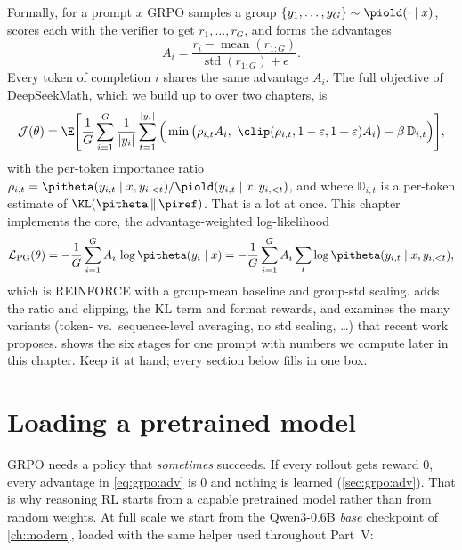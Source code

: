 Formally, for a prompt $x$ GRPO samples a group $\{y_1,\dots,y_G\}\sim\piold(\cdot\mid x)$,
scores each with the verifier to get $r_1,\dots,r_G$, and forms the advantages
\begin{equation}
A_i=\frac{r_i-\operatorname{mean}(r_{1:G})}{\operatorname{std}(r_{1:G})+\epsilon}.
\label{eq:grpo:adv}
\end{equation}
Every token of completion $i$ shares the same advantage $A_i$. The full objective of
DeepSeekMath, which we build up to over two chapters, is
\begin{equation}
\mathcal{J}(\theta)=\E\Bigg[\frac1G\sum_{i=1}^{G}\frac1{|y_i|}\sum_{t=1}^{|y_i|}
\Big(\min\big(\rho_{i,t}A_i,\ \clip(\rho_{i,t},1-\varepsilon,1+\varepsilon)A_i\big)
-\beta\,\mathbb{D}_{i,t}\Big)\Bigg],
\label{eq:grpo:full}
\end{equation}
with the per-token importance ratio
$\rho_{i,t}=\pitheta(y_{i,t}\mid x,y_{i,<t})/\piold(y_{i,t}\mid x,y_{i,<t})$, and where $\mathbb{D}_{i,t}$ is a per-token estimate of $\KL(\pitheta\,\|\,\piref)$. That is a
lot at once. This chapter implements the core, the advantage-weighted log-likelihood
\begin{equation}
\mathcal{L}_{\text{PG}}(\theta)=-\frac1G\sum_{i=1}^G A_i\,\log\pitheta(y_i\mid x)
 =-\frac1G\sum_{i=1}^G A_i\sum_{t}\log\pitheta(y_{i,t}\mid x,y_{i,<t}),
\label{eq:grpo:pg_loss}
\end{equation}
which is REINFORCE with a group-mean baseline and group-std scaling.  adds
the ratio and clipping, the KL term and format rewards, and examines the many variants
(token- vs.\ sequence-level averaging, no std scaling, \dots) that recent work proposes.
 shows the six stages for one prompt with numbers we compute later in
this chapter. Keep it at hand; every section below fills in one box.


\section{Loading a pretrained model}\label{sec:grpo:load}

GRPO needs a policy that \emph{sometimes} succeeds. If every rollout gets reward 0, every
advantage in \cref{eq:grpo:adv} is 0 and nothing is learned (\cref{sec:grpo:adv}). That is
why reasoning RL starts from a capable pretrained model rather than from random weights.
At full scale we start from the Qwen3-0.6B \emph{base} checkpoint of \cref{ch:modern},
loaded with the same helper used throughout Part~V:

